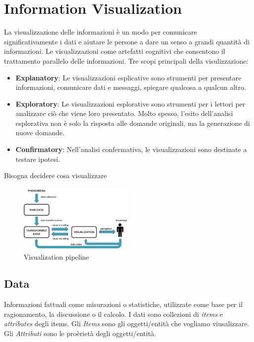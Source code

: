 \section{Information Visualization}
La visualizzazione delle informazioni è un modo per comunicare significativamente i dati e aiutare le persone a 
dare un senso a grandi quantità di informazioni.
Le visualizzazioni come artefatti cognitivi che consentono il trattamento parallelo delle informazioni.
Tre scopi principali della visulizzazione:
\begin{itemize}
    \item \textbf{Explanatory}: Le visualizzazioni esplicative sono strumenti per presentare informazioni, comunicare dati e messaggi, spiegare qualcosa a qualcun altro.
    \item \textbf{Exploratory}: Le visualizzazioni esplorative sono strumenti per i lettori per analizzare ciò che viene loro presentato. Molto spesso, l'esito dell'analisi esplorativa non è solo la risposta alle domande originali, ma la generazione di nuove domande.
    \item \textbf{Confirmatory}: Nell'analisi confermativa, le visualizzazioni sono destinate a testare ipotesi.
\end{itemize}

Bisogna decidere cosa visualizzare 
\begin{figure}[H]
    \centering
    \includegraphics[width=0.5\textwidth]{images/visPipe2.png} %
    \caption{Visualization pipeline}
    \label{fig:immagine}
\end{figure}
\subsection{Data}
Informazioni fattuali come misurazioni o statistiche, utilizzate come base per il ragionamento, la discussione o il calcolo.
I dati sono collezioni di \textit{items} e \textit{attributes} degli items.
Gli \textit{Items} sono gli oggetti/entità che vogliamo viusalizzare.
Gli \textit{Attributi} sono le proèrietà degli oggetti/entità.

